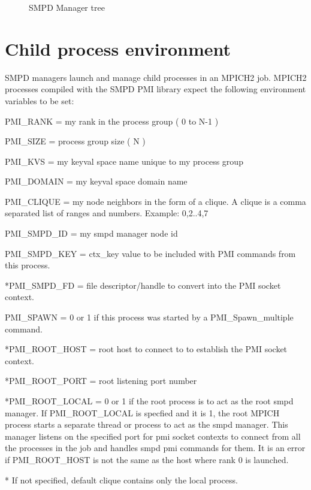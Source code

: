 \documentclass[dvipdfm,11pt]{article}
\begin{document}
\begin{figure}
\centerline{}
\caption{SMPD Manager tree}
\label{fig:tree}
\end{figure}

\section{Child process environment}
SMPD managers launch and manage child processes in an MPICH2 job.
MPICH2 processes compiled with the SMPD PMI library expect the following
environment variables to be set:

\begin{description}
\item PMI\_RANK = my rank in the process group ( 0 to N-1 )
\item PMI\_SIZE = process group size ( N )
\item PMI\_KVS = my keyval space name unique to my process group
\item PMI\_DOMAIN = my keyval space domain name
\item *PMI\_CLIQUE = my node neighbors in the form of a clique.  A clique is
a comma separated list of ranges and numbers.  Example: 0,2..4,7
\item PMI\_SMPD\_ID = my smpd manager node id
\item PMI\_SMPD\_KEY = ctx\_key value to be included with PMI commands 
from this process.
\item **PMI\_SMPD\_FD = file descriptor/handle to convert into the PMI 
socket context.
\item PMI\_SPAWN = 0 or 1 if this process was started by a 
PMI\_Spawn\_multiple command.
\item **PMI\_ROOT\_HOST = root host to connect to to establish the PMI 
socket context.
\item **PMI\_ROOT\_PORT = root listening port number
\item **PMI\_ROOT\_LOCAL = 0 or 1 if the root process is to act as the root smpd manager.
If PMI\_ROOT\_LOCAL is specfied and it is 1, the root MPICH process starts a separate
thread or process to act as the smpd manager.  This manager listens on the specified port
for pmi socket contexts to connect from all the processes in the job and handles smpd pmi
commands for them.  It is an error if PMI\_ROOT\_HOST is not the same as the host where
rank 0 is launched.
\end{description}

* If not specified, default clique contains only the local process.
\end{document}
